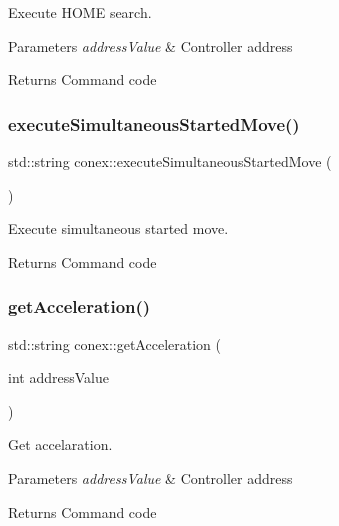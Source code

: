 Execute H\+O\+ME search. 


\begin{DoxyParams}{Parameters}
{\em address\+Value} & Controller address \\
\hline
\end{DoxyParams}
\begin{DoxyReturn}{Returns}
Command code 
\end{DoxyReturn}
\mbox{\label{namespaceconex_a2502bb0dfe401313b2505e560b41c8d5}} 
\subsubsection{\texorpdfstring{execute\+Simultaneous\+Started\+Move()}{executeSimultaneousStartedMove()}}
{\footnotesize\ttfamily std\+::string conex\+::execute\+Simultaneous\+Started\+Move (\begin{DoxyParamCaption}{ }\end{DoxyParamCaption})}



Execute simultaneous started move. 

\begin{DoxyReturn}{Returns}
Command code 
\end{DoxyReturn}
\mbox{\label{namespaceconex_a9ccf7065a08f5cb5c21c45efcb0c76db}} 
\subsubsection{\texorpdfstring{get\+Acceleration()}{getAcceleration()}}
{\footnotesize\ttfamily std\+::string conex\+::get\+Acceleration (\begin{DoxyParamCaption}\item[{int}]{address\+Value }\end{DoxyParamCaption})}



Get accelaration. 


\begin{DoxyParams}{Parameters}
{\em address\+Value} & Controller address \\
\hline
\end{DoxyParams}
\begin{DoxyReturn}{Returns}
Command code 
\end{DoxyReturn}
\mbox{\label{namespaceconex_a7480495275a9236b221d635dd5bc08f8}} 
